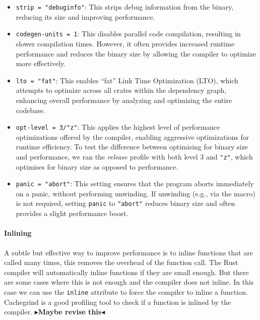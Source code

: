 \documentclass[11pt]{report}
\theoremstyle{definition}
\theoremstyle{plain}
\newcommand{\todo}[1]{{\color[rgb]{.5,0,0}\textbf{$\blacktriangleright$#1$\blacktriangleleft$}}}
\begin{document}
\begin{itemize}
  \item \texttt{strip = "debuginfo"}: This strips debug information from the binary, reducing its size and improving performance.

  \item \texttt{codegen-units = 1}: This disables parallel code compilation, resulting in slower compilation times. However, it often provides increased runtime performance and reduces the binary size by allowing the compiler to optimize more effectively.

  \item \texttt{lto = "fat"}: This enables ``fat'' Link Time Optimization (LTO), which attempts to optimize across all crates within the dependency graph, enhancing overall performance by analyzing and optimizing the entire codebase.

  \item \texttt{opt-level = 3/"z"}: This applies the highest level of performance optimizations offered by the compiler, enabling aggressive optimizations for runtime efficiency. To test the difference between optimising for binary size and performance, we ran the \textit{release} profile with both level 3 and \texttt{"z"}, which optimises for binary size as opposed to performance.


  \item \texttt{panic = "abort"}: This setting ensures that the program aborts immediately on a panic, without performing unwinding. If unwinding (e.g., via the  macro) is not required, setting \texttt{panic} to \texttt{"abort"} reduces binary size and often provides a slight performance boost.
\end{itemize}

\paragraph{Inlining}
A subtle but effective way to improve performance is to inline functions that are called many times, this removes the overhead of the function call. The Rust compiler will automatically inline functions if they are small enough. But there are some cases where this is not enough and the compiler does not inline. In this case we can use the \texttt{inline} attribute to force the compiler to inline a function. Cachegrind is a good profiling tool to check if a function is inlined by the compiler.
\todo{Maybe revise this}
\end{document}
